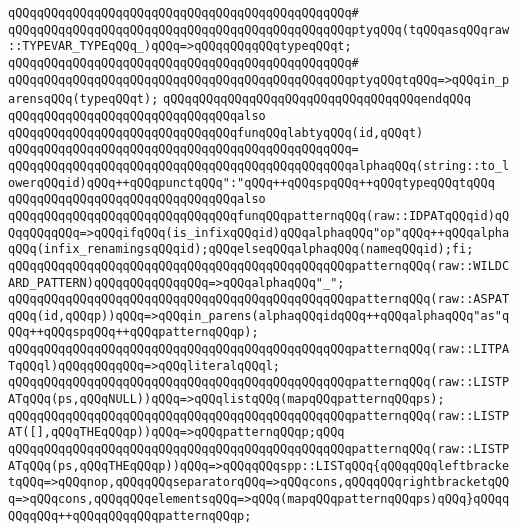 \verb|qQQqqQQqqQQqqQQqqQQqqQQqqQQqqQQqqQQqqQQqqQQqqQQq#|\newline
\verb|qQQqqQQqqQQqqQQqqQQqqQQqqQQqqQQqqQQqqQQqqQQqqQQqptyqQQq(tqQQqasqQQqraw::TYPEVAR_TYPEqQQq_)qQQq=>qQQqqQQqqQQqtypeqQQqt;|\newline
\verb|qQQqqQQqqQQqqQQqqQQqqQQqqQQqqQQqqQQqqQQqqQQqqQQq#|\newline
\verb|qQQqqQQqqQQqqQQqqQQqqQQqqQQqqQQqqQQqqQQqqQQqqQQqptyqQQqtqQQq=>qQQqin_parensqQQq(typeqQQqt);|\newline
\verb|qQQqqQQqqQQqqQQqqQQqqQQqqQQqqQQqqQQqendqQQq|\newline
\newline
\verb|qQQqqQQqqQQqqQQqqQQqqQQqqQQqqQQqalso|\newline
\verb|qQQqqQQqqQQqqQQqqQQqqQQqqQQqqQQqfunqQQqlabtyqQQq(id,qQQqt)|\newline
\verb|qQQqqQQqqQQqqQQqqQQqqQQqqQQqqQQqqQQqqQQqqQQqqQQq=|\newline
\verb|qQQqqQQqqQQqqQQqqQQqqQQqqQQqqQQqqQQqqQQqqQQqqQQqalphaqQQq(string::to_lowerqQQqid)qQQq++qQQqpunctqQQq":"qQQq++qQQqspqQQq++qQQqtypeqQQqtqQQq|\newline
\newline
\verb|qQQqqQQqqQQqqQQqqQQqqQQqqQQqqQQqalso|\newline
\verb|qQQqqQQqqQQqqQQqqQQqqQQqqQQqqQQqfunqQQqpatternqQQq(raw::IDPATqQQqid)qQQqqQQqqQQq=>qQQqifqQQq(is_infixqQQqid)qQQqalphaqQQq"op"qQQq++qQQqalphaqQQq(infix_renamingsqQQqid);qQQqelseqQQqalphaqQQq(nameqQQqid);fi;|\newline
\verb|qQQqqQQqqQQqqQQqqQQqqQQqqQQqqQQqqQQqqQQqqQQqqQQqpatternqQQq(raw::WILDCARD_PATTERN)qQQqqQQqqQQqqQQq=>qQQqalphaqQQq"_";|\newline
\verb|qQQqqQQqqQQqqQQqqQQqqQQqqQQqqQQqqQQqqQQqqQQqqQQqpatternqQQq(raw::ASPATqQQq(id,qQQqp))qQQq=>qQQqin_parens(alphaqQQqidqQQq++qQQqalphaqQQq"as"qQQq++qQQqspqQQq++qQQqpatternqQQqp);|\newline
\verb|qQQqqQQqqQQqqQQqqQQqqQQqqQQqqQQqqQQqqQQqqQQqqQQqpatternqQQq(raw::LITPATqQQql)qQQqqQQqqQQq=>qQQqliteralqQQql;|\newline
\verb|qQQqqQQqqQQqqQQqqQQqqQQqqQQqqQQqqQQqqQQqqQQqqQQqpatternqQQq(raw::LISTPATqQQq(ps,qQQqNULL))qQQq=>qQQqlistqQQq(mapqQQqpatternqQQqps);|\newline
\verb|qQQqqQQqqQQqqQQqqQQqqQQqqQQqqQQqqQQqqQQqqQQqqQQqpatternqQQq(raw::LISTPAT([],qQQqTHEqQQqp))qQQq=>qQQqpatternqQQqp;qQQq|\newline
\verb|qQQqqQQqqQQqqQQqqQQqqQQqqQQqqQQqqQQqqQQqqQQqqQQqpatternqQQq(raw::LISTPATqQQq(ps,qQQqTHEqQQqp))qQQq=>qQQqqQQqspp::LISTqQQq{qQQqqQQqleftbracketqQQq=>qQQqnop,qQQqqQQqseparatorqQQq=>qQQqcons,qQQqqQQqrightbracketqQQq=>qQQqcons,qQQqqQQqelementsqQQq=>qQQq(mapqQQqpatternqQQqps)qQQq}qQQqqQQqqQQq++qQQqqQQqqQQqpatternqQQqp;|\newline
